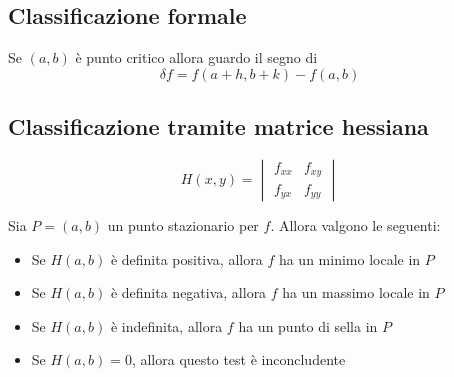 \subsection{Classificazione formale}

Se $(a,b)$ è punto critico allora guardo il segno di
$$\delta f = f(a+h,b+k)-f(a,b)$$

\subsection{Classificazione tramite matrice hessiana}

$$
H(x,y) = \begin{vmatrix}
f_{xx} & f_{xy} \\
f_{yx} & f_{yy}
\end{vmatrix}
$$

Sia $P = (a,b)$ un punto stazionario per $f$. Allora valgono le seguenti:
\begin{itemize}
\item Se $H(a,b)$ è definita positiva, allora $f$ ha un minimo locale in $P$
\item Se $H(a,b)$ è definita negativa, allora $f$ ha un massimo locale in $P$
\item Se $H(a,b)$ è indefinita, allora $f$ ha un punto di sella in $P$
\item Se $H(a,b) = 0$, allora questo test è inconcludente
\end{itemize}